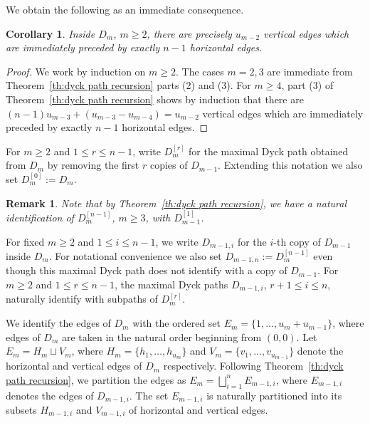 \documentclass{amsart}
\newtheorem{corollary}[theorem]{Corollary}
\newtheorem{remark}[theorem]{Remark}
\numberwithin{equation}{section}
\begin{document}
We obtain the following as an immediate consequence.
\begin{corollary}
  \label{cor:short hooks}
  Inside $D_m$, $m\ge2$, there are precisely $u_{m-2}$ vertical edges which are immediately preceded by exactly $n-1$ horizontal edges.
\end{corollary}
\begin{proof}
  We work by induction on $m\ge2$.
  The cases $m=2,3$ are immediate from Theorem~\ref{th:dyck path recursion} parts (2) and (3).
  For $m\ge4$, part (3) of Theorem~\ref{th:dyck path recursion} shows by induction that there are $(n-1)u_{m-3}+(u_{m-3}-u_{m-4})=u_{m-2}$ vertical edges which are immediately preceded by exactly $n-1$ horizontal edges.
\end{proof}

For $m\ge2$ and $1\le r\le n-1$, write $D_m^{[r]}$ for the maximal Dyck path obtained from $D_m$ by removing the first $r$ copies of $D_{m-1}$.
Extending this notation we also set $D_m^{[0]}:=D_m$.
\begin{remark}
  Note that by Theorem~\ref{th:dyck path recursion}, we have a natural identification of $D_m^{[n-1]}$, $m\ge3$, with $D_{m-1}^{[1]}$.
\end{remark}
For fixed $m\ge2$ and $1\le i\le n-1$, we write $D_{m-1,i}$ for the $i$-th copy of $D_{m-1}$ inside $D_m$.
For notational convenience we also set $D_{m-1,n}:=D_m^{[n-1]}$ even though this maximal Dyck path does not identify with a copy of $D_{m-1}$.
For $m\ge2$ and $1\le r\le n-1$, the maximal Dyck paths $D_{m-1,i}$, $r+1\le i\le n$, naturally identify with subpaths of $D_m^{[r]}$.

We identify the edges of $D_m$ with the ordered set $E_m=\{1,\ldots,u_m+u_{m-1}\}$, where edges of $D_m$ are taken in the natural order beginning from $(0,0)$.
Let $E_m=H_m\sqcup V_m$, where $H_m=\{h_1,\ldots,h_{u_m}\}$ and $V_m=\{v_1,\ldots,v_{u_{m-1}}\}$ denote the horizontal and vertical edges of $D_m$ respectively.
Following Theorem~\ref{th:dyck path recursion}, we partition the edges as $E_m=\bigsqcup_{i=1}^n E_{m-1,i}$, where $E_{m-1,i}$ denotes the edges of $D_{m-1,i}$.
The set $E_{m-1,i}$ is naturally partitioned into its subsets $H_{m-1,i}$ and $V_{m-1,i}$ of horizontal and vertical edges.
\end{document}
